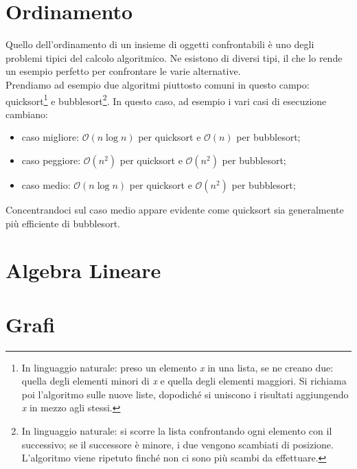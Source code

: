 \section{Ordinamento}
Quello dell'ordinamento di un insieme di oggetti confrontabili è uno degli problemi tipici del calcolo algoritmico. Ne esistono di diversi tipi, il che lo rende un esempio perfetto per confrontare le varie alternative.\\
Prendiamo ad esempio due algoritmi piuttosto comuni in questo campo: quicksort\footnote{In linguaggio naturale: preso un elemento \textit{x} in una lista, se ne creano due: quella degli elementi minori di \textit{x} e quella degli elementi maggiori. Si richiama poi l'algoritmo sulle nuove liste, dopodiché si uniscono i risultati aggiungendo \textit{x} in mezzo agli stessi.} e bubblesort\footnote{In linguaggio naturale: si scorre la lista confrontando ogni elemento con il successivo; se il successore è minore, i due vengono scambiati di posizione. L'algoritmo viene ripetuto finché non ci sono più scambi da effettuare.}. In questo caso, ad esempio i vari casi di esecuzione cambiano:
\begin{itemize}
\item{caso migliore:  $\mathcal {O}(n \log {}n)$ per quicksort e  $\mathcal {O}(n)$ per bubblesort;}
\item{caso peggiore:  $\mathcal {O}(n^2)$ per quicksort e  $\mathcal {O}(n^2)$ per bubblesort;}
\item{caso medio:  $\mathcal {O}(n \log {}n)$ per quicksort e  $\mathcal {O}(n^2)$ per bubblesort;}
\end{itemize}
Concentrandoci sul caso medio appare evidente come quicksort sia generalmente più efficiente di bubblesort.
\section{Algebra Lineare}

\section{Grafi}
